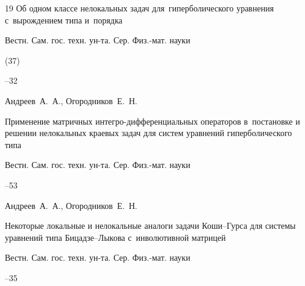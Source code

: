 \begin{thebibliography}{19}
\paper Об одном классе нелокальных задач для~гиперболического уравнения с~вырождением типа и~порядка

\jour Вестн. Сам. гос. техн. ун-та. Сер. Физ.-мат. науки


(37)

--32






\by Андреев~А.~А., Огородников~Е.~Н.

\paper Применение матричных интегро-дифференциальных операторов в~постановке и решении нелокальных краевых задач для систем уравнений гиперболического типа

\jour Вестн. Сам. гос. техн. ун-та. Сер. Физ.-мат. науки



--53






\by Андреев~А.~А., Огородников~Е.~Н.

\paper Некоторые локальные и нелокальные аналоги задачи Коши--Гурса для системы уравнений типа Бицадзе--Лыкова с~инволютивной матрицей

\jour Вестн. Сам. гос. техн. ун-та. Сер. Физ.-мат. науки



--35





\end{thebibliography}



\RuDate



\newpage



\smallskip



\makeentitle











